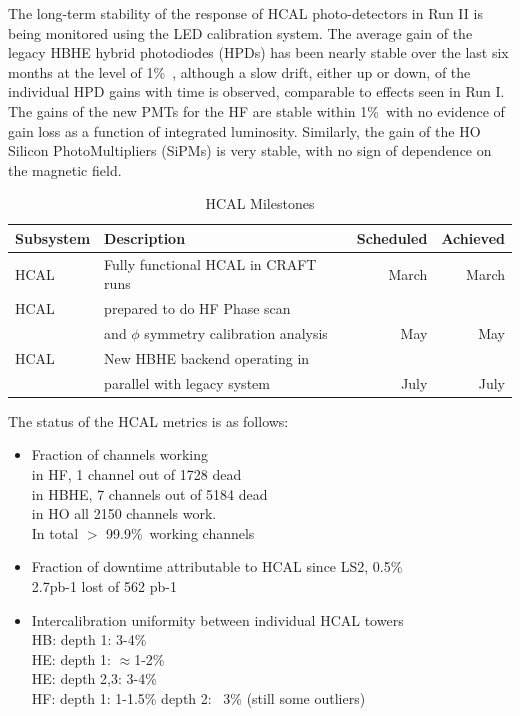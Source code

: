 The long-term stability of the response of HCAL photo-detectors in Run II is being monitored using the LED calibration system. The average gain of the legacy HBHE hybrid photodiodes (HPDs) has been nearly stable over the last six months at the level of 1\%\ , although a slow drift, either up or down, of the individual HPD gains with time is observed, comparable to effects seen in Run I. The gains of the new PMTs for the HF are stable within 1\%\, 
with no evidence of gain loss as a function of integrated luminosity. 
Similarly, the gain of the HO Silicon PhotoMultipliers (SiPMs) is very stable, with no sign of dependence on the magnetic field.
\begin{table}[htp]
\caption{HCAL Milestones}
\begin{center}
\begin{tabular}{|l|l|r|r|}
\hline
Subsystem&Description&Scheduled&Achieved\\
\hline
HCAL& Fully functional HCAL in CRAFT runs & March & March\\
\hline
HCAL& prepared to do HF Phase scan & &\\
&and $\phi$ symmetry calibration analysis& May& May\\
\hline
HCAL&New HBHE backend operating in& &\\
& parallel with legacy system& July & July\\
\hline
\end{tabular}
\end{center}
\label{HCALMilestones}
\end{table}%

The status of the HCAL metrics is as follows:
\begin{itemize}

\item Fraction of channels working\\
in HF, 1 channel out of 1728 dead \\
in HBHE, 7 channels out of 5184 dead\\
in HO all 2150 channels work.\\
In total $>$ 99.9\%\ working channels
\item Fraction of downtime attributable to HCAL since LS2, 0.5\% \\ 
2.7pb-1 lost of 562 pb-1
\item Intercalibration uniformity between individual HCAL towers\\
HB: depth 1:  3-4\%  \\
HE: depth 1:  $\approx$1-2\%  \\
HE: depth 2,3: 3-4\% \\
HF: depth 1: 1-1.5\%  depth 2: ~3\% (still some outliers)\\
\end{itemize}

